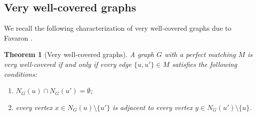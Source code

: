 \documentclass[12pt]{amsart}
\numberwithin{equation}{section}
\newtheorem{thm}{\bf Theorem}[section]
\theoremstyle{definition}
\begin{document}
\subsection{Very well-covered graphs} We recall the following characterization of very well-covered graphs due to Favaron \cite[Theorem 1.2]{F}.

\begin{thm}[Very well-covered graphs]\label{thm_very_well_char} 
A graph $G$ with a perfect matching $M$ is very well-covered if and only if every edge $\{u, u'\} \in M$ satisfies the following conditions:
\begin{enumerate}
    \item $N_G(u) \cap N_G(u') = \emptyset$;
    \item every vertex $x \in N_G(u) \setminus \{u'\}$ is adjacent to every vertex $y \in N_G(u') \setminus \{u\}$.
\end{enumerate}
\end{thm}
\end{document}
